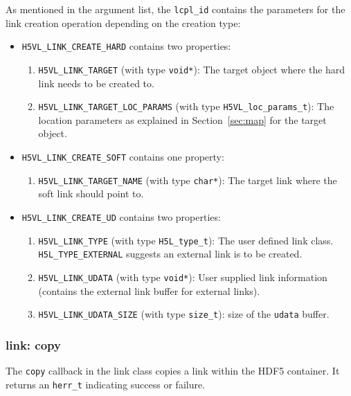 As mentioned in the argument list, the \texttt{lcpl\_id} contains the
parameters for the link creation operation depending on the creation
type:
\begin{itemize}
\item \texttt{H5VL\_LINK\_CREATE\_HARD} contains two properties:
  \begin{enumerate}
  \item \texttt{H5VL\_LINK\_TARGET} (with type \texttt{void*}): The target
    object where the hard link needs to be created to.
  \item \texttt{H5VL\_LINK\_TARGET\_LOC\_PARAMS} (with type \texttt{H5VL\_loc\_params\_t}): The location parameters as explained in
    Section~\ref{sec:map} for the target object.
  \end{enumerate}

\item \texttt{H5VL\_LINK\_CREATE\_SOFT} contains one property:
  \begin{enumerate}
  \item \texttt{H5VL\_LINK\_TARGET\_NAME} (with type \texttt{char*}): The target
    link where the soft link should point to.
  \end{enumerate}

\item \texttt{H5VL\_LINK\_CREATE\_UD} contains two properties:
  \begin{enumerate}
  \item \texttt{H5VL\_LINK\_TYPE} (with type \texttt{H5L\_type\_t}): The
    user defined link class. \texttt{H5L\_TYPE\_EXTERNAL} suggests an
    external link is to be created.
  \item \texttt{H5VL\_LINK\_UDATA} (with type \texttt{void*}): User supplied
    link information (contains the external link buffer for external
    links). 
  \item \texttt{H5VL\_LINK\_UDATA\_SIZE} (with type \texttt{size\_t}): size
    of the \texttt{udata} buffer. 
  \end{enumerate}
\end{itemize}

\subsubsection{link: copy}
The \texttt{copy} callback in the link class copies a link within the HDF5 container. It returns an \texttt{herr\_t} indicating success or failure.\bigskip


